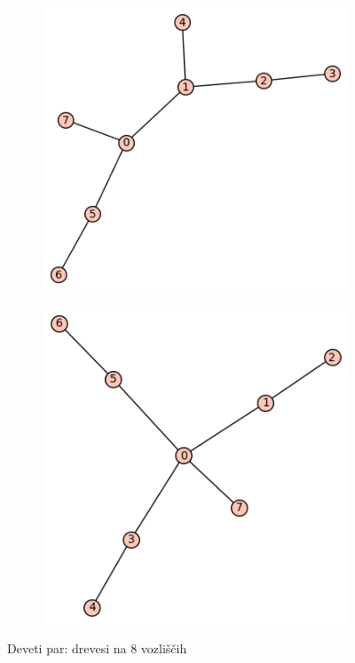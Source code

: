 \documentclass[12pt, a4paper]{article}
\begin{document}
\begin{center}
\begin{center}
\begin{figure}[!htb]
\centering
\begin{subfigure}{0.5\textwidth}
  \centering
  \includegraphics[width=0.4\linewidth]{t-30}
\end{subfigure}%
\begin{subfigure}{0.5\textwidth}
  \centering
  \includegraphics[width=0.5\linewidth]{t-44}
\end{subfigure}
\caption{Deveti par: drevesi na 8 vozliščih}
\label{fig:test}
\end{figure}
\end{center}


\end{center}
\end{document}
